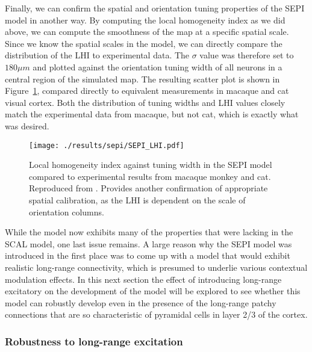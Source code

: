 Finally, we can confirm the spatial and orientation tuning properties
of the SEPI model in another way. By computing the local homogeneity
index as we did above, we can compute the smoothness of the map at a
specific spatial scale. Since we know the spatial scales in the model,
we can directly compare the distribution of the LHI to experimental
data. The $\sigma$ value was therefore set to $180 \mu m$ and plotted
against the orientation tuning width of all neurons in a central
region of the simulated map. The resulting scatter plot is shown in
Figure~\ref{SEPILHI}, compared directly to equivalent measurements in
macaque and cat visual cortex. Both the distribution of tuning widths
and LHI values closely match the experimental data from macaque, but
not cat, which is exactly what was desired.

\begin{figure}
	\centering
        \texttt{[image: ./results/sepi/SEPI\_LHI.pdf]}
	\caption{Local homogeneity index against tuning width in the SEPI
      model compared to experimental results from macaque monkey and
      cat. Reproduced from \cite{Nauhaus2008}. Provides another
      confirmation of appropriate spatial calibration, as the LHI is
      dependent on the scale of orientation columns.}
	\label{SEPILHI}
\end{figure}

While the model now exhibits many of the properties that were lacking
in the SCAL model, one last issue remains. A large reason why the SEPI
model was introduced in the first place was to come up with a model
that would exhibit realistic long-range connectivity, which is
presumed to underlie various contextual modulation effects. In this
next section the effect of introducing long-range excitatory on the
development of the model will be explored to see whether this model
can robustly develop even in the presence of the long-range patchy
connections that are so characteristic of pyramidal cells in layer 2/3
of the cortex.

\subsubsection*{Robustness to long-range excitation}

